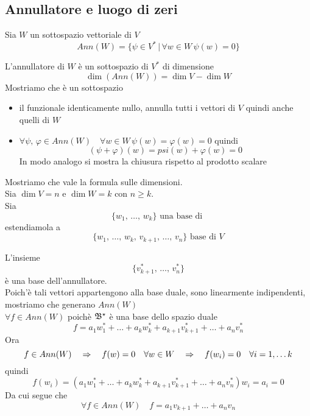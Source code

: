 \subsection{Annullatore e luogo di zeri}
\begin{defn}[Annullatore] \bianco
Sia $W$ un sottospazio vettoriale di $V$ 
$$ Ann(W)=\{ \psi \in V^* \, \vert \, \forall w \in W \, \psi(w)=0 \} $$
\end{defn}

\begin{prop} L'annullatore di $W$ \`e un sottospazio di $V^*$ di dimensione 
$$ \dim (Ann(W))=\dim V - \dim W $$
\proof  Mostriamo che \`e un sottospazio 
\begin{itemize}
\item il funzionale identicamente nullo, annulla tutti i vettori di $V$ quindi anche quelli di $W$
\item $\forall \psi, \, \varphi \in Ann(W) \quad \forall w \in W \, \psi (w)=\varphi (w)=0 $ quindi
$$ (\psi + \varphi)(w)= psi (w)+ \varphi (w)=0 $$
In modo analogo si mostra la chiusura rispetto al prodotto scalare
\end{itemize}
Mostriamo che vale la formula sulle dimensioni.\\
Sia $\dim V = n $ e $ \dim W = k $ con $ n \geq k $.\\
Sia 
$$\{ w_1,\, \dots , \, w_k\} \text{  una base di } $$ estendiamola a 
$$ \{ w_1,\, \dots , \, w_k,\, v_{k+1} ,\, \dots ,\, v_n \} \text{ base di } V$$

L'insieme $$ \{v_{k+1}^* ,\, \dots ,\, v_n ^*\}$$ \`e una base dell'annullatore.\\
Poich'\`e tali vettori appartengono alla base duale, sono linearmente indipendenti, mostriamo che generano $Ann(W)$\\
$ \forall f \in Ann(W) $ poich\`e $\mathfrak{B}^\star$ \`e una base dello spazio duale 
$$f= a_1 w_1^* + \dots + a_k w_k^* + a_{k+1} v_{k+1} ^* + \dots + a_n v_n ^* $$
Ora 
$$ f \in Ann (W) \quad \Rightarrow \quad f(w)=0 \quad \forall w \in W \quad \Rightarrow \quad f(w_i)=0 \quad \forall i=1,\dots k $$
quindi
$$ f(w_i) = (  a_1 w_1^* + \dots + a_k w_k^* + a_{k+1} v_{k+1} ^* + \dots + a_n v_n ^*) w_i = a_i =0 $$
Da cui segue che 
$$ \forall f \in Ann(W) \quad f = a_1 v_{k+1} + \dots + a_n v_n $$
\endproof
\end{prop}

